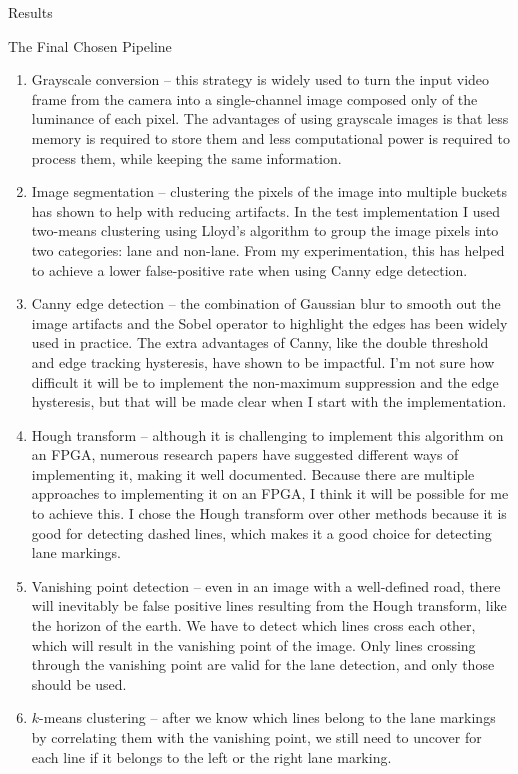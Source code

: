\documentclass{matthijs}
\begin{document}
\begin{hoofdstuk}{Results}
\begin{paragraaf}{The Final Chosen Pipeline}
\begin{enumerate}
				\item	Grayscale conversion -- this strategy is widely used to turn the input video frame from the camera into a single-channel image composed only of the luminance of each pixel.
					The advantages of using grayscale images is that less memory is required to store them and less computational power is required to process them, while keeping the same information.
				\item	Image segmentation -- clustering the pixels of the image into multiple buckets has shown to help with reducing artifacts.
					In the test implementation I used two-means clustering using Lloyd's algorithm to group the image pixels into two categories: lane and non-lane.
					From my experimentation, this has helped to achieve a lower false-positive rate when using Canny edge detection.
				\item	Canny edge detection -- the combination of Gaussian blur to smooth out the image artifacts and the Sobel operator to highlight the edges has been widely used in practice.
					The extra advantages of Canny, like the double threshold and edge tracking hysteresis, have shown to be impactful.
					I'm not sure how difficult it will be to implement the non-maximum suppression and the edge hysteresis, but that will be made clear when I start with the implementation.
				\item	Hough transform -- although it is challenging to implement this algorithm on an FPGA, numerous research papers have suggested different ways of implementing it, making it well documented.
					Because there are multiple approaches to implementing it on an FPGA, I think it will be possible for me to achieve this.
					I chose the Hough transform over other methods because it is good for detecting dashed lines, which makes it a good choice for detecting lane markings.
				\item	Vanishing point detection -- even in an image with a well-defined road, there will inevitably be false positive lines resulting from the Hough transform, like the horizon of the earth.
					We have to detect which lines cross each other, which will result in the vanishing point of the image.
					Only lines crossing through the vanishing point are valid for the lane detection, and only those should be used.
				\item	$k$-means clustering -- after we know which lines belong to the lane markings by correlating them with the vanishing point, we still need to uncover for each line if it belongs to the left or the right lane marking.

\end{enumerate}
\end{paragraaf}
\end{hoofdstuk}
\end{document}
